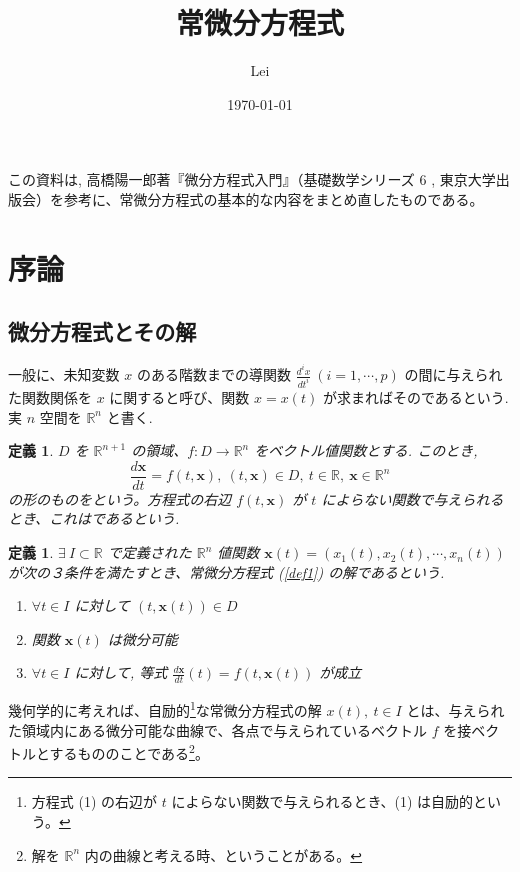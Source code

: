 \documentclass[dvipdfmx, a4paper]{jsarticle}
\title{常微分方程式}
\author{Lei}
\date{\today}
\newcommand{\R}{\mathbb{R}}
\newcommand{\x}{\bm{x}}
\newtheorem{definition}[theorem]{定義}
\begin{document}
\maketitle

この資料は, 高橋陽一郎著『微分方程式入門』（基礎数学シリーズ 6 , 東京大学出版会）を参考に、常微分方程式の基本的な内容をまとめ直したものである。

\section{序論}

\subsection{微分方程式とその解}

一般に、未知変数 $x$ のある階数までの導関数 $\frac{d^ix}{dt^i}\ (i=1, \cdots, p)$ の間に与えられた関数関係を $x$ に関すると呼び、関数 $x=x(t)$ が求まればそのであるという. 実 $n$ 空間を $\R^n$ と書く.

\begin{definition}
    $D$ を $\R^{n+1}$ の領域、$f: D\to \R^n$ をベクトル値関数とする. このとき,
    \begin{equation}
        \label{def1}
        \frac{d\x}{dt}=f(t, \x),\ (t, \x)\in D,\ t\in\R,\ \x\in\R^n
    \end{equation}
    の形のものをという。方程式の右辺 $f(t, \x)$ が $t$ によらない関数で与えられるとき、これはであるという.
\end{definition}

\begin{definition}
    $\exists\ I\subset\R$ で定義された $\R^n$ 値関数 $\x(t)=(x_1(t), x_2(t), \cdots, x_n(t))$ が次の３条件を満たすとき、常微分方程式 (\ref{def1}) の解であるという.
    \begin{enumerate}
        \item $\forall t\in I$ に対して $(t, \x(t))\in D$
        \item 関数 $\x(t)$ は微分可能
        \item $\forall t\in I$ に対して, 等式 $\frac{d\x}{dt}(t)=f(t, \x(t))$ が成立
    \end{enumerate}
\end{definition}

幾何学的に考えれば、自励的\footnote{方程式 (1) の右辺が $t$ によらない関数で与えられるとき、(1) は自励的という。}な常微分方程式の解 $x(t),\ t\in I$ とは、与えられた領域内にある微分可能な曲線で、各点で与えられているベクトル $f$ を接ベクトルとするもののことである\footnote{解を $\R^n$ 内の曲線と考える時、ということがある。}。
\end{document}
